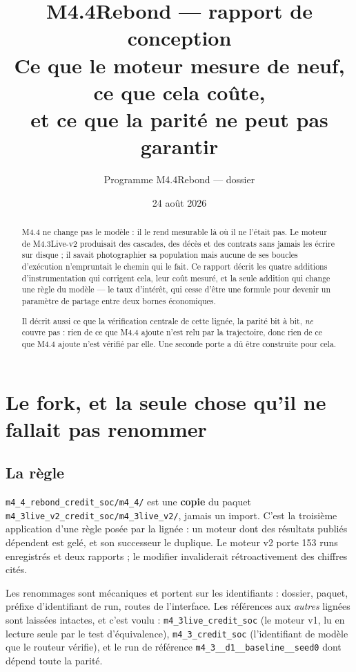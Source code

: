 \documentclass[11pt,a4paper]{article}
\title{M4.4Rebond --- rapport de conception\\
\large Ce que le moteur mesure de neuf, ce que cela coûte,\\
et ce que la parité ne peut pas garantir}
\author{Programme M4.4Rebond --- dossier \code{m4\_4\_rebond\_credit\_soc}}
\date{24 août 2026}
\newcommand{\code}[1]{\texttt{#1}}
\begin{document}
\maketitle

\begin{abstract}
M4.4 ne change pas le modèle : il le rend mesurable là où il ne l'était pas.
Le moteur de M4.3Live-v2 produisait des cascades, des décès et des contrats
sans jamais les écrire sur disque ; il savait photographier sa population
mais aucune de ses boucles d'exécution n'empruntait le chemin qui le fait.
Ce rapport décrit les quatre additions d'instrumentation qui corrigent cela,
leur coût mesuré, et la seule addition qui change une règle du modèle --- le
taux d'intérêt, qui cesse d'être une formule pour devenir un paramètre de
partage entre deux bornes économiques.

Il décrit aussi ce que la vérification centrale de cette lignée, la parité
bit à bit, \emph{ne} couvre pas : rien de ce que M4.4 ajoute n'est relu par
la trajectoire, donc rien de ce que M4.4 ajoute n'est vérifié par elle. Une
seconde porte a dû être construite pour cela.
\end{abstract}

\tableofcontents

\section{Le fork, et la seule chose qu'il ne fallait pas renommer}

\subsection{La règle}

\code{m4\_4\_rebond\_credit\_soc/m4\_4/} est une \textbf{copie} du paquet
\code{m4\_3live\_v2\_credit\_soc/m4\_3live\_v2/}, jamais un import. C'est la
troisième application d'une règle posée par la lignée : un moteur dont des
résultats publiés dépendent est gelé, et son successeur le duplique. Le
moteur v2 porte 153 runs enregistrés et deux rapports ; le modifier
invaliderait rétroactivement des chiffres cités.

Les renommages sont mécaniques et portent sur les identifiants : dossier,
paquet, préfixe d'identifiant de run, routes de l'interface. Les références
aux \emph{autres} lignées sont laissées intactes, et c'est voulu :
\code{m4\_3live\_credit\_soc} (le moteur v1, lu en lecture seule par le test
d'équivalence), \code{m4\_3\_credit\_soc} (l'identifiant de modèle que le
routeur vérifie), et le run de référence \code{m4\_3\_\_d1\_\_baseline\_\_seed0}
dont dépend toute la parité.
\end{document}
